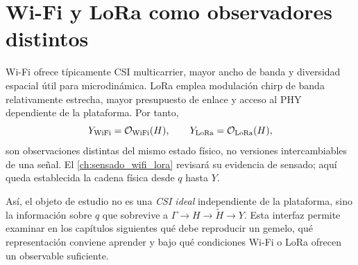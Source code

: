 \section{Wi-Fi y LoRa como observadores distintos}

Wi-Fi ofrece típicamente CSI multicarrier, mayor ancho de banda y diversidad espacial útil para microdinámica. LoRa emplea modulación chirp de banda relativamente estrecha, mayor presupuesto de enlace y acceso al PHY dependiente de la plataforma. Por tanto,
\begin{equation}
Y_{\rm WiFi}=\mathcal O_{\rm WiFi}(H),\qquad
Y_{\rm LoRa}=\mathcal O_{\rm LoRa}(H),
\end{equation}
son observaciones distintas del mismo estado físico, no versiones intercambiables de una señal. El \cref{ch:sensado_wifi_lora} revisará su evidencia de sensado; aquí queda establecida la cadena física desde $q$ hasta $Y$.

Así, el objeto de estudio no es una \emph{CSI ideal} independiente de la
plataforma, sino la información sobre $q$ que sobrevive a
$\Gamma\rightarrow H\rightarrow\widetilde H\rightarrow Y$. Esta interfaz permite
examinar en los capítulos siguientes qué debe reproducir un gemelo, qué
representación conviene aprender y bajo qué condiciones Wi-Fi o LoRa ofrecen un
observable suficiente.
